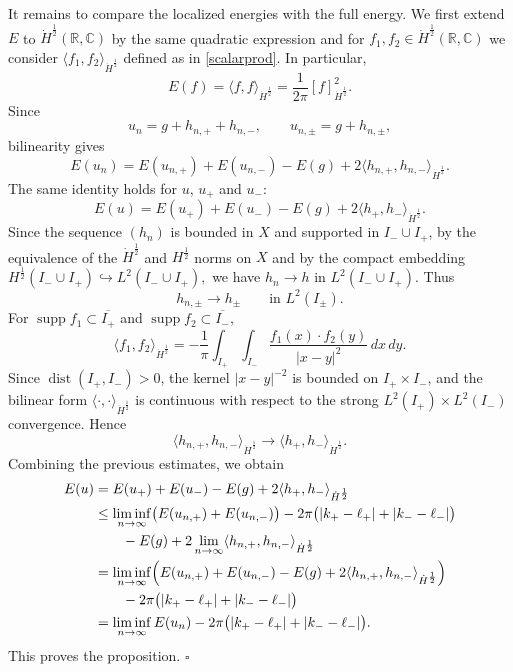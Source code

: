 \documentclass[12pt, a4paper]{article}
\renewcommand{\(}{\left(}
\renewcommand{\)}{\right)}
\begin{document}
It remains to compare the localized energies with the full energy. We first extend $E$ to $\dot H^{\frac12}(\mathbb R,\mathbb C)$ by the same
quadratic expression and for $f_1,f_2\in \dot H^{\frac12}(\mathbb R,\mathbb C)$ we consider $\langle f_1,f_2\rangle_{\dot H^{\frac12}}$ defined as in \eqref{scalarprod}.
In particular,
\[
E(f)=\langle f,f\rangle_{\dot H^{\frac12}}
=\frac{1}{2\pi}[f]^2_{\dot H^{\frac12}}.
\]
Since
\[
u_n=g+h_{n,+}+h_{n,-},
\qquad
u_{n,\pm}=g+h_{n,\pm},
\]
bilinearity gives
\[
E(u_n)
=
E(u_{n,+})+E(u_{n,-})-E(g)
+
2\langle h_{n,+},h_{n,-}\rangle_{\dot H^{\frac12}}.
\]
The same identity holds for $u$, $u_+$ and $u_-$:
\[   E(u)  = E(u_+)+E(u_-)-E(g) + 2\langle h_+,h_-\rangle_{\dot H^{\frac12}}.\]
Since the sequence
$(h_n)$ is bounded in $X$ and supported in $I_-\cup I_+$, by the equivalence of the $\dot H^{\frac12}$ and
$H^{\frac12}$ norms on $X$ and by the compact embedding
$
H^{\frac12}(I_-\cup I_+)\hookrightarrow L^2(I_-\cup I_+),
$
we have
$
h_n\to h$ in $L^2(I_-\cup I_+)$.
Thus
\[
        h_{n,\pm}\to h_\pm
        \qquad\text{in } L^2(I_\pm).
\]
For $\operatorname{supp} f_1\subset \overline{I_+}$ and
$\operatorname{supp} f_2\subset \overline{I_-}$,  
\[
        \langle f_1,f_2\rangle_{\dot H^{\frac12}}
        =
        -\frac{1}{\pi}
        \int_{I_+}\int_{I_-}
        \frac{f_1(x)\cdot f_2(y)}{|x-y|^2}\,dx\,dy .
\]
Since $\operatorname{dist}(I_+,I_-)>0$, the kernel $|x-y|^{-2}$ is bounded
on $I_+\times I_-$, and the bilinear form $\langle \cdot , \cdot \rangle_{\dot H^{\frac12}}$ is continuous with respect to the strong $L^2(I_+)\times L^2(I_-)$ convergence. Hence
\[
        \langle h_{n,+},h_{n,-}\rangle_{\dot H^{\frac12}}
        \longrightarrow
        \langle h_+,h_-\rangle_{\dot H^{\frac12}}.
\]
Combining the previous estimates, we obtain
\[
\begin{aligned}
        E(u)
        &=
        E(u_+)+E(u_-)-E(g)
        +
        2\langle h_+,h_-\rangle_{\dot H^{\frac12}}
        \\
        &\le
        \liminf_{n\to\infty}
        \bigl(E(u_{n,+})+E(u_{n,-})\bigr)
        -
        2\pi\bigl(|k_+-\ell_+|+|k_- - \ell_-|\bigr)
        \\
        &\qquad
        -E(g)
        +
        2\lim_{n\to\infty}
        \langle h_{n,+},h_{n,-}\rangle_{\dot H^{\frac12}}
        \\
        &=
        \liminf_{n\to\infty}
        \Bigl(
        E(u_{n,+})+E(u_{n,-})-E(g)
        +
        2\langle h_{n,+},h_{n,-}\rangle_{\dot H^{\frac12}}
        \Bigr)
        \\
        &\qquad
        -
        2\pi\bigl(|k_+-\ell_+|+|k_- - \ell_-|\bigr)
        \\
        &=
        \liminf_{n\to\infty}E(u_n)
        -
        2\pi\bigl(|k_+-\ell_+|+|k_- - \ell_-|\bigr).
\end{aligned}
\]
This proves the proposition. \hfill$\square$
\end{document}
